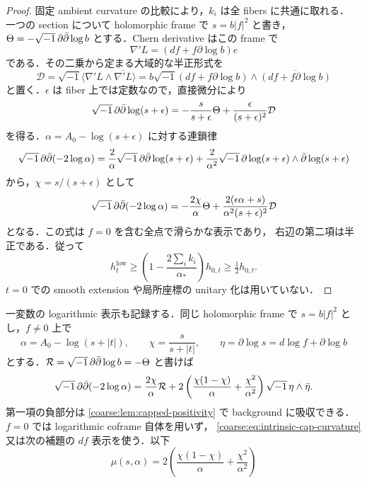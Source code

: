 \documentclass[a4paper,11pt]{ltjsarticle}
\numberwithin{equation}{section}
\theoremstyle{plain}
\theoremstyle{definition}
\theoremstyle{remark}
\begin{document}
\begin{proof}
固定 ambient curvature の比較により，$k_i$ は全 fibers に共通に取れる．
一つの section について holomorphic frame で $s=b|f|^2$ と書き，
$\Theta=-\sqrt{-1}\,\partial\bar\partial\log b$ とする．Chern derivative はこの frame で
\[
 \nabla' L=(df+f\partial\log b)e
\]
である．その二乗から定まる大域的な半正形式を
\[
 \mathcal D
 =\sqrt{-1}\langle\nabla' L\wedge\overline{\nabla' L}\rangle
 =b\sqrt{-1}(df+f\partial\log b)
             \wedge\overline{(df+f\partial\log b)}
\]
と置く．$\epsilon$ は fiber 上では定数なので，直接微分により
\[
 \sqrt{-1}\,\partial\bar\partial\log(s+\epsilon)
 =-\frac{s}{s+\epsilon}\Theta
   +\frac{\epsilon}{(s+\epsilon)^2}\mathcal D
\]
を得る．$\alpha=A_0-\log(s+\epsilon)$ に対する連鎖律
\begin{equation}\label{coarse:eq:one-cap-curvature}
 \sqrt{-1}\,\partial\bar\partial(-2\log\alpha)
 =\frac{2}{\alpha}\sqrt{-1}\,\partial\bar\partial\log(s+\epsilon)
 +\frac{2}{\alpha^2}\sqrt{-1}\,
       \partial\log(s+\epsilon)\wedge\bar\partial\log(s+\epsilon)
\end{equation}
から，$\chi=s/(s+\epsilon)$ として
\begin{equation}\label{coarse:eq:intrinsic-cap-curvature}
 \sqrt{-1}\,\partial\bar\partial(-2\log\alpha)
 =-\frac{2\chi}{\alpha}\Theta
  +\frac{2(\epsilon\alpha+s)}
         {\alpha^2(s+\epsilon)^2}\mathcal D
\end{equation}
となる．この式は $f=0$ を含む全点で滑らかな表示であり，
右辺の第二項は半正である．従って
\[
 h_t^{\mathrm{low}}
 \ge\left(1-\frac{2\sum_i k_i}{\alpha_*}\right)h_{0,t}
 \ge\tfrac12h_{0,t}.
\]
$t=0$ での smooth extension や局所座標の unitary 化は用いていない．
\end{proof}

一変数の logarithmic 表示も記録する．同じ holomorphic frame で
$s=b|f|^2$ とし，$f\ne0$ 上で
\[
 \alpha=A_0-\log(s+|t|),\qquad
 \chi=\frac{s}{s+|t|},\qquad
 \eta=\partial\log s=d\log f+\partial\log b
\]
とする．$\mathcal R=\sqrt{-1}\,\partial\bar\partial\log b=-\Theta$ と書けば
\begin{equation}\label{coarse:eq:exact-cap-curvature}
 \sqrt{-1}\,\partial\bar\partial(-2\log\alpha)
 =\frac{2\chi}{\alpha}\mathcal R
 +2\left(
     \frac{\chi(1-\chi)}{\alpha}
     +\frac{\chi^2}{\alpha^2}
   \right)\sqrt{-1}\,\eta\wedge\bar\eta .
\end{equation}
第一項の負部分は \cref{coarse:lem:capped-positivity} で background に吸収できる．
$f=0$ では logarithmic coframe 自体を用いず，
\eqref{coarse:eq:intrinsic-cap-curvature}又は次の補題の $df$ 表示を使う．以下
\begin{equation}\label{coarse:eq:mu-cap}
 \mu(s,\alpha)=2\left(
     \frac{\chi(1-\chi)}{\alpha}
     +\frac{\chi^2}{\alpha^2}
   \right)
\end{equation}
\end{document}
